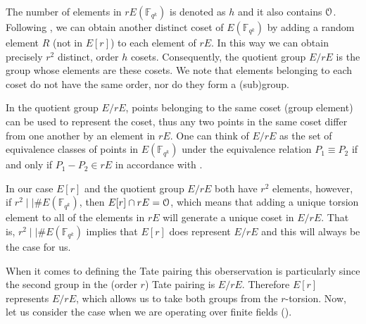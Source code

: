 

The number of elements in $rE(\mathbb{F}_{q^k})$ is denoted as $h$ and it also contains $\EuScript{O}$. Following \cite{Sco04}, we can obtain another distinct
coset of $E(\mathbb{F}_{q^k})$ by adding a random element $R$ (not in $E[r]$) to each element
of $rE$.  In this way we can obtain precisely $r^2$ distinct, order $h$ cosets. Consequently, 
the quotient group $E/rE$ is the group whose elements are these cosets. We note that elements belonging to each coset do not have the same order, nor do they
form a (sub)group. 

In the quotient group $E/rE$, points belonging to the same
coset (group element) can be used to represent the coset, thus any two points in the
same coset differ from one another by an element in $rE$.  One can think of
$E/rE$ as the set of equivalence classes of points in $E(\mathbb{F}_{q^k})$ under the equivalence
relation $P_1 \equiv P_2$ if and only if $P_1 - P_2 \in rE$ in accordance with  \cite{Gal05}.




In our case $E[r]$ and the quotient group $E/rE$ both have $r^2$ elements, however, if $r^2 \mid \mid \#E(\mathbb{F}_{q^k})$, then $E[r] \cap rE = \EuScript{O}$, which means
that adding a unique torsion element to all of the elements in $rE$ will generate
a unique coset in $E/rE$. That is, $r^2 \mid \mid \#E(\mathbb{F}_{q^k})$ implies that $E[r]$ does represent $E/rE$ and this will always be the case for us. 

When it comes to defining the Tate pairing this oberservation is particularly since the second group in the (order $r$) Tate pairing is $E/rE$. Therefore  $E[r]$ represents $E/rE$, which allows us to  take both groups from the $r$-torsion. Now, let us consider the case when we are operating over finite fields ().



